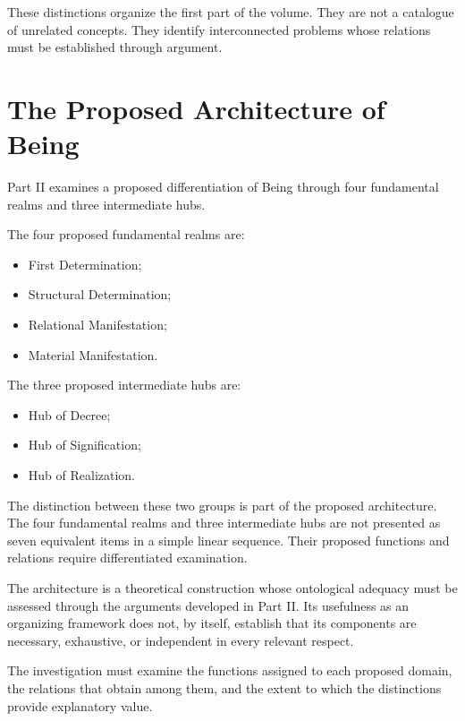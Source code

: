These distinctions organize the first part
of the volume. They are not a catalogue
of unrelated concepts. They identify
interconnected problems whose relations
must be established through argument.



\section*{The Proposed Architecture of Being}

Part II examines a proposed differentiation
of Being through four fundamental realms
and three intermediate hubs.

The four proposed fundamental realms are:

\begin{itemize}
    \item First Determination;
    \item Structural Determination;
    \item Relational Manifestation;
    \item Material Manifestation.
\end{itemize}

The three proposed intermediate hubs are:

\begin{itemize}
    \item Hub of Decree;
    \item Hub of Signification;
    \item Hub of Realization.
\end{itemize}

The distinction between these two groups
is part of the proposed architecture.
The four fundamental realms and three
intermediate hubs are not presented as
seven equivalent items in a simple linear
sequence. Their proposed functions and
relations require differentiated examination.

The architecture is a theoretical construction
whose ontological adequacy must be assessed
through the arguments developed in Part II.
Its usefulness as an organizing framework
does not, by itself, establish that its
components are necessary, exhaustive, or
independent in every relevant respect.

The investigation must examine the functions
assigned to each proposed domain, the
relations that obtain among them, and
the extent to which the distinctions
provide explanatory value.

